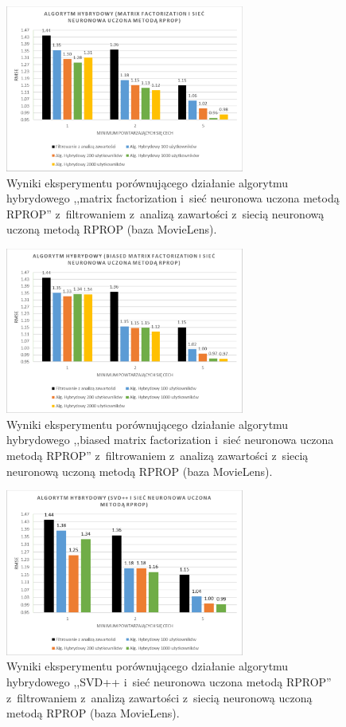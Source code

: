 \documentclass[twoside]{iisthesis}
\begin{document}
		\begin{figure}
			\centering
			\includegraphics[width=0.7\textwidth]{ml_exphybrid1_4}			
			\caption{Wyniki eksperymentu porównującego działanie algorytmu hybrydowego ,,matrix factorization i~sieć neuronowa uczona metodą RPROP'' z~filtrowaniem z~analizą zawartości z~siecią neuronową uczoną metodą RPROP (baza MovieLens).}
			\label{fig:ml_exphybrid1_4}
		\end{figure}
	
		\begin{figure}
			\centering
			\includegraphics[width=0.7\textwidth]{ml_exphybrid1_5}			
			\caption{Wyniki eksperymentu porównującego działanie algorytmu hybrydowego ,,biased matrix factorization i~sieć neuronowa uczona metodą RPROP'' z~filtrowaniem z~analizą zawartości z~siecią neuronową uczoną metodą RPROP (baza MovieLens).}
			\label{fig:ml_exphybrid1_5}
		\end{figure}
		
		\begin{figure}
			\centering
			\includegraphics[width=0.7\textwidth]{ml_exphybrid1_6}			
			\caption{Wyniki eksperymentu porównującego działanie algorytmu hybrydowego ,,SVD++ i~sieć neuronowa uczona metodą RPROP'' z~filtrowaniem z~analizą zawartości z~siecią neuronową uczoną metodą RPROP (baza MovieLens).}
			\label{fig:ml_exphybrid1_6}
		\end{figure}
		
\end{document}
